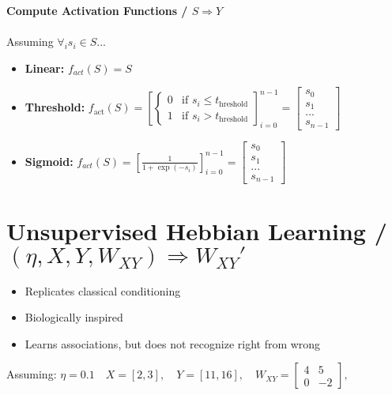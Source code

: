 \documentclass[12 pt]{article}
\begin{document}
	\textbf{Compute Activation Functions / $S \Rightarrow Y$}\\\\
	Assuming $\forall_i s_i \in S$...
	\begin{itemize}
		\item \textbf{Linear:} $f_{act}(S) = S$
		\item \textbf{Threshold:}
		$
		f_{\text{act}}(S) = \left[ \begin{cases}
			0 & \text{if } s_i \le t_{\text{hreshold}}\\
			1 & \text{if } s_i > t_{\text{hreshold}}
		\end{cases}\right]_{i=0}^{n-1}
		= \begin{bmatrix}s_0\\s_{1}\\...\\s_{n-1}\end{bmatrix}
		$
		\item \textbf{Sigmoid:}
		$
			f_{act}(S) = \left[ \frac{1}{1 + \exp(-s_i)}\right]_{i=0}^{n-1}
			= \begin{bmatrix}s_0\\s_1\\...\\s_{n-1}\end{bmatrix}
		$
	\end{itemize}

\newpage\thispagestyle{empty}
\section*{Unsupervised Hebbian Learning / $(\eta, X, Y, W_{XY}) \Rightarrow W_{XY}'$}

	\begin{itemize}
		\item Replicates classical conditioning
		\item Biologically inspired
		\item Learns associations, but does not recognize right from wrong
	\end{itemize}

	Assuming:
		$
			\eta = 0.1
			\quad X = [2, 3],
			\quad Y = [11, 16],
			\quad W_{XY} = \begin{bmatrix}4 & 5\\0 & -2\end{bmatrix},
		$\\\\
\end{document}
